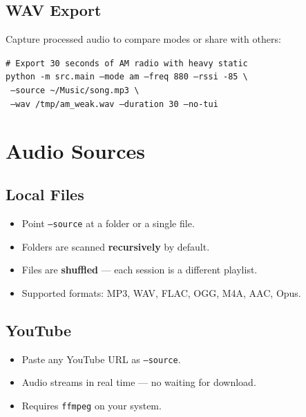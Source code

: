 \documentclass[11pt,a4paper]{article}
\newcommand{\cmd}[1]{\textcolor{radioDark}{\texttt{#1}}}
\begin{document}
\subsection*{WAV Export}

Capture processed audio to compare modes or share with others:

{\footnotesize
\begin{tcolorbox}[colback=radioLight, colframe=radioGray, left=2mm, right=2mm]
\texttt{\# Export 30 seconds of AM radio with heavy static}\\
\texttt{python -m src.main --mode am --freq 880 --rssi -85 \textbackslash}\\
\texttt{\hspace{4mm} --source \textasciitilde/Music/song.mp3 \textbackslash}\\
\texttt{\hspace{4mm} --wav /tmp/am\_weak.wav --duration 30 --no-tui}
\end{tcolorbox}
}

\section{Audio Sources}

\subsection*{Local Files}
\begin{itemize}[nosep]
    \item Point \cmd{--source} at a folder or a single file.
    \item Folders are scanned \textbf{recursively} by default.
    \item Files are \textbf{shuffled} --- each session is a different playlist.
    \item Supported formats: MP3, WAV, FLAC, OGG, M4A, AAC, Opus.
\end{itemize}

\subsection*{YouTube}
\begin{itemize}[nosep]
    \item Paste any YouTube URL as \cmd{--source}.
    \item Audio streams in real time --- no waiting for download.
    \item Requires \texttt{ffmpeg} on your system.
\end{itemize}
\end{document}
